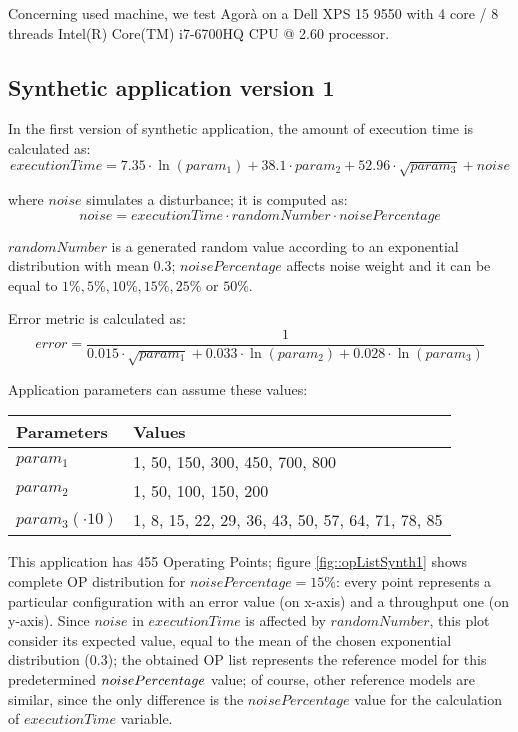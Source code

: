 Concerning used machine, we test Agorà on a Dell XPS 15 9550 with 4 core / 8 threads Intel(R) Core(TM) i7-6700HQ CPU @ 2.60 processor.


\subsection{Synthetic application version 1}

In the first version of synthetic application, the amount of execution time is calculated as:
\[
executionTime = 7.35 \cdot \ln{(param_1)} + 38.1 \cdot param_2 + 52.96 \cdot \sqrt{param_3} + noise
\]

where $noise$ simulates a disturbance; it is computed as:
\[
noise = executionTime \cdot randomNumber \cdot noisePercentage
\]

$randomNumber$ is a generated random value according to an exponential distribution with mean 0.3; $noisePercentage$ affects noise weight and it can be equal to $1\%, 5\%, 10\%, 15\%, 25\%$ or $50\%$.

Error metric is calculated as:
\[
error = \dfrac{1}{0.015 \cdot \sqrt{param_1} + 0.033 \cdot \ln{(param_2)} + 0.028 \cdot \ln{(param_3)}}
\]

Application parameters can assume these values:

\begin{center}

    \begin{tabular}{ll}
    
        \toprule
        Parameters & Values \\
        \midrule
        $param_1$ & 1, 50, 150, 300, 450, 700, 800 \\
        $param_2$ & 1, 50, 100, 150, 200 \\
        $param_3 (\cdot 10)$ & 1, 8, 15, 22, 29, 36, 43, 50, 57, 64, 71, 78, 85 \\
        \bottomrule 
    
    \end{tabular}

\end{center}

This application has 455 Operating Points; figure \ref{fig::opListSynth1} shows complete OP distribution for $noisePercentage = 15\%$: every point represents a particular configuration with an error value (on x-axis) and a throughput one (on y-axis). Since $noise$ in $executionTime$ is affected by $randomNumber$, this plot consider its expected value, equal to the mean of the chosen exponential distribution (0.3); the obtained OP list represents the reference model for this predetermined $noise\-Per\-cent\-age$ value; of course, other reference models are similar, since the only difference is the $noisePercentage$ value for the calculation of $executionTime$ variable.

